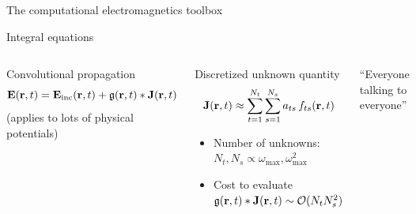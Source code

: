 \documentclass[aspectratio=169, usenames, dvipsnames]{beamer}
\begin{document}
\begin{frame}{The computational electromagnetics toolbox}
  \begin{center}
    
  \end{center}
\end{frame}

\begin{frame}{Integral equations}
  \begin{columns}
    \begin{block}{Convolutional propagation}
      \begin{equation*}
        \vb{E}(\vb{r}, t) = \vb{E}_\text{inc}(\vb{r}, t) + \mathfrak{g}(\vb{r}, t) * \vb{J}(\vb{r}, t)
      \end{equation*}
      \hfill \tiny{(applies to lots of physical potentials)}
    \end{block}

    \begin{block}{Discretized unknown quantity}
      \begin{equation*}
        \vb{J}(\vb{r}, t) \approx \sum_{t=1}^{N_t} \sum_{s=1}^{N_s} a_{ts} \, f_{ts}(\vb{r}, t)
      \end{equation*}
      \begin{itemize}
        \item Number of unknowns: $N_t, N_s \propto \omega_\text{max}, \omega_\text{max}^2$
        \item Cost to evaluate $\mathfrak{g}(\vb{r}, t) * \vb{J}(\vb{r}, t) \sim \mathcal{O}(N_t N_s^2)$
      \end{itemize}
    \end{block}

      \begin{center}
        
        {\small ``Everyone talking to everyone''}
      \end{center}
  \end{columns}
\end{frame}
\end{document}
